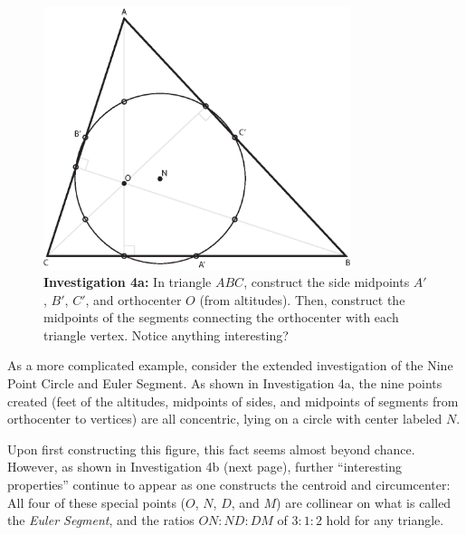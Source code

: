 \begin{figure}[h!]
\centering
\includegraphics[width=0.8\textwidth]{diagrams/nine-point.eps}
\captionsetup{labelformat=empty}
\caption{{\bf Investigation 4a:} In triangle $ABC$, construct the side
  midpoints $A'$, $B'$, $C'$, and orthocenter $O$ (from altitudes).
  Then, construct the midpoints of the segments connecting the
  orthocenter with each triangle vertex.  Notice anything
  interesting?}
\end{figure}

As a more complicated example, consider the extended investigation of
the Nine Point Circle and Euler Segment.  As shown in Investigation
4a, the nine points created (feet of the altitudes, midpoints of
sides, and midpoints of segments from orthocenter to vertices) are all
concentric, lying on a circle with center labeled $N$.

Upon first constructing this figure, this fact seems almost beyond
chance.  However, as shown in Investigation 4b (next page), further
``interesting properties'' continue to appear as one constructs the
centroid and circumcenter: All four of these special points ($O$, $N$,
$D$, and $M$) are collinear on what is called the \emph{Euler
  Segment}, and the ratios $ON:ND:DM$ of $3:1:2$ hold for any
triangle.

